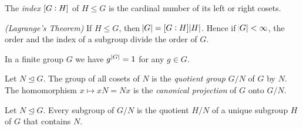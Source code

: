 \vspace{2mm}

\begin{definition}
	The \emph{index} $\intcc{G:H}$ of $H \leq G$ is the cardinal number of its left or right cosets.
\end{definition}

\vspace{2mm}

\begin{proposition}\emph{(Lagrange's Theorem)}
	If $H \leq G$, then $\abs{G} = \intcc{G : H}\abs{H}$. Hence if $\abs{G} < \infty$, the order and the index of a subgroup divide the order of $G$.
\end{proposition}

\vspace{2mm}

\begin{theorem}
	In a finite group $G$ we have $g^{\abs[0]{G}} = 1$ for any $g \in G$.
\end{theorem}

\vspace{2mm}

\begin{definition}
	Let $N \unlhd G$. The group of all cosets of $N$ is the \emph{quotient group} $G/N$ of $G$ by $N$. The homomorphism $x \mapsto xN = Nx$ is the \emph{canonical projection} of $G$ onto $G/N$.
\end{definition}

\vspace{2mm}

\begin{proposition}
	Let $N \unlhd G$. Every subgroup of $G/N$ is the quotient $H/N$ of a unique subgroup $H$ of $G$ that contains $N$.
\end{proposition}

\vspace{2mm}





